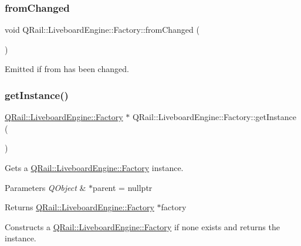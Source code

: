 \subsubsection{\texorpdfstring{fromChanged}{fromChanged}}
{\footnotesize\ttfamily void Q\+Rail\+::\+Liveboard\+Engine\+::\+Factory\+::from\+Changed (\begin{DoxyParamCaption}{ }\end{DoxyParamCaption})\hspace{0.3cm}{\ttfamily [signal]}}



Emitted if from has been changed. 

\mbox{\label{classQRail_1_1LiveboardEngine_1_1Factory_a08e37a6538aad6341edf7066f10a63c7}} 
\subsubsection{\texorpdfstring{getInstance()}{getInstance()}}
{\footnotesize\ttfamily \mbox{\hyperlink{classQRail_1_1LiveboardEngine_1_1Factory}{Q\+Rail\+::\+Liveboard\+Engine\+::\+Factory}} $\ast$ Q\+Rail\+::\+Liveboard\+Engine\+::\+Factory\+::get\+Instance (\begin{DoxyParamCaption}{ }\end{DoxyParamCaption})\hspace{0.3cm}{\ttfamily [static]}}



Gets a \mbox{\hyperlink{classQRail_1_1LiveboardEngine_1_1Factory}{Q\+Rail\+::\+Liveboard\+Engine\+::\+Factory}} instance. 


\begin{DoxyParams}{Parameters}
{\em Q\+Object} & $\ast$parent = nullptr \\
\hline
\end{DoxyParams}
\begin{DoxyReturn}{Returns}
\mbox{\hyperlink{classQRail_1_1LiveboardEngine_1_1Factory}{Q\+Rail\+::\+Liveboard\+Engine\+::\+Factory}} $\ast$factory
\end{DoxyReturn}
Constructs a \mbox{\hyperlink{classQRail_1_1LiveboardEngine_1_1Factory}{Q\+Rail\+::\+Liveboard\+Engine\+::\+Factory}} if none exists and returns the instance. \mbox{\label{classQRail_1_1LiveboardEngine_1_1Factory_adc3e3cb8c87171641f33f77367074a02}} 

